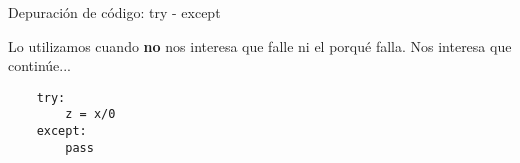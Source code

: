 \begin{frame}[fragile]{Depuración de código: try - except}\vspace{10pt}

Lo utilizamos cuando \textbf{no} nos interesa que falle ni el porqué falla. Nos interesa que continúe...

\begin{center}
\begin{lstlisting}
	try:
		z = x/0
	except:
		pass
\end{lstlisting}
\end{center}
\end{frame}